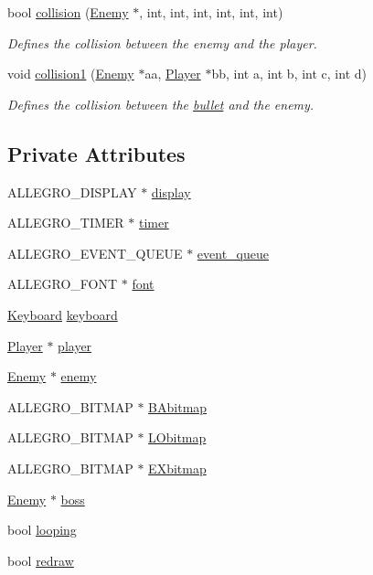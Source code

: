 \begin{DoxyCompactItemize}
bool \hyperlink{classAllegro_a10d4912b8dfc5b7b5a13db103e441bfe}{collision} (\hyperlink{classEnemy}{Enemy} $\ast$, int, int, int, int, int, int)
\begin{DoxyCompactList}\small\item\em Defines the collision between the enemy and the player. \item\end{DoxyCompactList}\item 
void \hyperlink{classAllegro_ab73885862f77defd9dac0868f18ca4cd}{collision1} (\hyperlink{classEnemy}{Enemy} $\ast$aa, \hyperlink{classPlayer}{Player} $\ast$bb, int a, int b, int c, int d)
\begin{DoxyCompactList}\small\item\em Defines the collision between the \hyperlink{classbullet}{bullet} and the enemy. \item\end{DoxyCompactList}\end{DoxyCompactItemize}
\subsection*{Private Attributes}
\begin{DoxyCompactItemize}
\item 
ALLEGRO\_\-DISPLAY $\ast$ \hyperlink{classAllegro_a3e51f319f189787a5341d3297727eba5}{display}
\item 
ALLEGRO\_\-TIMER $\ast$ \hyperlink{classAllegro_a34a3f6946a82531b3cd7855bf96dfec5}{timer}
\item 
ALLEGRO\_\-EVENT\_\-QUEUE $\ast$ \hyperlink{classAllegro_a4a2c1d6a0009b87fb04ac4726814623a}{event\_\-queue}
\item 
ALLEGRO\_\-FONT $\ast$ \hyperlink{classAllegro_a2c2276e5a5822696792c9c11c00731f2}{font}
\item 
\hyperlink{classKeyboard}{Keyboard} \hyperlink{classAllegro_a4bef38bf146ab5025f9a4f39bc7016f7}{keyboard}
\item 
\hyperlink{classPlayer}{Player} $\ast$ \hyperlink{classAllegro_a888f6af0c64c1c1eac49fc54d283e035}{player}
\item 
\hyperlink{classEnemy}{Enemy} $\ast$ \hyperlink{classAllegro_a70ea4292a405eb94fc4165fe19c7eaa4}{enemy}
\item 
ALLEGRO\_\-BITMAP $\ast$ \hyperlink{classAllegro_ae10751d99b7a4921df87ac34b3757e24}{BAbitmap}
\item 
ALLEGRO\_\-BITMAP $\ast$ \hyperlink{classAllegro_aa9dd463e9143160fd90433e5eea920b0}{LObitmap}
\item 
ALLEGRO\_\-BITMAP $\ast$ \hyperlink{classAllegro_ad2c4aa4c19d5dbadb8c5c95b1e69dfa9}{EXbitmap}
\item 
\hyperlink{classEnemy}{Enemy} $\ast$ \hyperlink{classAllegro_a5711e0348cbd0cfa61bca6bb8badae45}{boss}
\item 
bool \hyperlink{classAllegro_ae15c8aa4996c4a2063f5678630eb9e65}{looping}
\item 
bool \hyperlink{classAllegro_a09c325f5ec95db410ce99ea5c4312b4b}{redraw}
\end{DoxyCompactItemize}


